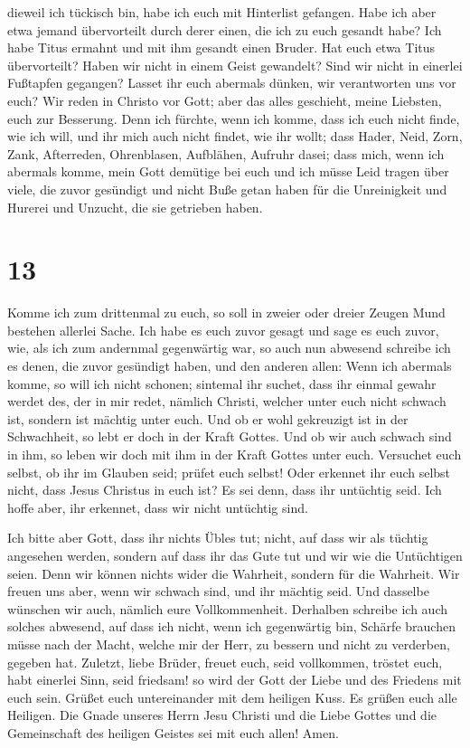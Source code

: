 dieweil ich tückisch bin, habe ich euch mit Hinterlist gefangen.
 Habe ich aber etwa jemand übervorteilt durch derer
einen, die ich zu euch gesandt habe?  Ich habe Titus
ermahnt und mit ihm gesandt einen Bruder. Hat euch etwa Titus
übervorteilt? Haben wir nicht in einem Geist gewandelt? Sind wir nicht
in einerlei Fußtapfen gegangen?  Lasset ihr euch abermals
dünken, wir verantworten uns vor euch? Wir reden in Christo vor Gott;
aber das alles geschieht, meine Liebsten, euch zur Besserung.
 Denn ich fürchte, wenn ich komme, dass ich euch nicht
finde, wie ich will, und ihr mich auch nicht findet, wie ihr wollt; dass
Hader, Neid, Zorn, Zank, Afterreden, Ohrenblasen, Aufblähen, Aufruhr
dasei;  dass mich, wenn ich abermals komme, mein Gott
demütige bei euch und ich müsse Leid tragen über viele, die zuvor
gesündigt und nicht Buße getan haben für die Unreinigkeit und Hurerei
und Unzucht, die sie getrieben haben.

\hypertarget{section-12}{%
\section{13}\label{section-12}}

 Komme ich zum drittenmal zu euch, so soll in zweier oder
dreier Zeugen Mund bestehen allerlei Sache.  Ich habe es
euch zuvor gesagt und sage es euch zuvor, wie, als ich zum andernmal
gegenwärtig war, so auch nun abwesend schreibe ich es denen, die zuvor
gesündigt haben, und den anderen allen: Wenn ich abermals komme, so will
ich nicht schonen;  sintemal ihr suchet, dass ihr einmal
gewahr werdet des, der in mir redet, nämlich Christi, welcher unter euch
nicht schwach ist, sondern ist mächtig unter euch.  Und ob
er wohl gekreuzigt ist in der Schwachheit, so lebt er doch in der Kraft
Gottes. Und ob wir auch schwach sind in ihm, so leben wir doch mit ihm
in der Kraft Gottes unter euch.  Versuchet euch selbst, ob
ihr im Glauben seid; prüfet euch selbst! Oder erkennet ihr euch selbst
nicht, dass Jesus Christus in euch ist? Es sei denn, dass ihr untüchtig
seid.  Ich hoffe aber, ihr erkennet, dass wir nicht
untüchtig sind.

 Ich bitte aber Gott, dass ihr nichts Übles tut; nicht,
auf dass wir als tüchtig angesehen werden, sondern auf dass ihr das Gute
tut und wir wie die Untüchtigen seien.  Denn wir können
nichts wider die Wahrheit, sondern für die Wahrheit.  Wir
freuen uns aber, wenn wir schwach sind, und ihr mächtig seid. Und
dasselbe wünschen wir auch, nämlich eure Vollkommenheit. 
Derhalben schreibe ich auch solches abwesend, auf dass ich nicht, wenn
ich gegenwärtig bin, Schärfe brauchen müsse nach der Macht, welche mir
der Herr, zu bessern und nicht zu verderben, gegeben hat.
 Zuletzt, liebe Brüder, freuet euch, seid vollkommen,
tröstet euch, habt einerlei Sinn, seid friedsam! so wird der Gott der
Liebe und des Friedens mit euch sein.  Grüßet euch
untereinander mit dem heiligen Kuss. Es grüßen euch alle Heiligen.
 Die Gnade unseres Herrn Jesu Christi und die Liebe
Gottes und die Gemeinschaft des heiligen Geistes sei mit euch allen!
Amen.
